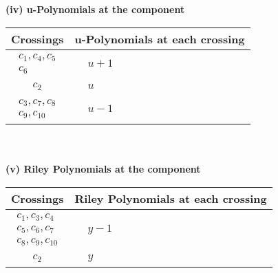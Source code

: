 \documentclass[1p]{elsarticle_modified}
\theoremstyle{definition}
\begin{document}
\newpage\renewcommand{\arraystretch}{1}
\flushleft \textbf{(iv) u-Polynomials at the component}\newline \\
\begin{tabular}{m{50pt}|m{274pt}}
Crossings & \hspace{64pt}u-Polynomials at each crossing \\
\hline $$\begin{aligned}c_{1},c_{4},c_{5}\\c_{6}\end{aligned}$$&$\begin{aligned}
&u+1
\end{aligned}$\\
\hline $$\begin{aligned}c_{2}\end{aligned}$$&$\begin{aligned}
&u
\end{aligned}$\\
\hline $$\begin{aligned}c_{3},c_{7},c_{8}\\c_{9},c_{10}\end{aligned}$$&$\begin{aligned}
&u-1
\end{aligned}$\\
\hline
\end{tabular}\\~\\
\newpage\renewcommand{\arraystretch}{1}
\flushleft \textbf{(v) Riley Polynomials at the component}\newline \\
\begin{tabular}{m{50pt}|m{274pt}}
Crossings & \hspace{64pt}Riley Polynomials at each crossing \\
\hline $$\begin{aligned}c_{1},c_{3},c_{4}\\c_{5},c_{6},c_{7}\\c_{8},c_{9},c_{10}\end{aligned}$$&$\begin{aligned}
&y-1
\end{aligned}$\\
\hline $$\begin{aligned}c_{2}\end{aligned}$$&$\begin{aligned}
&y
\end{aligned}$\\
\hline
\end{tabular}\\~\\
\end{document}
